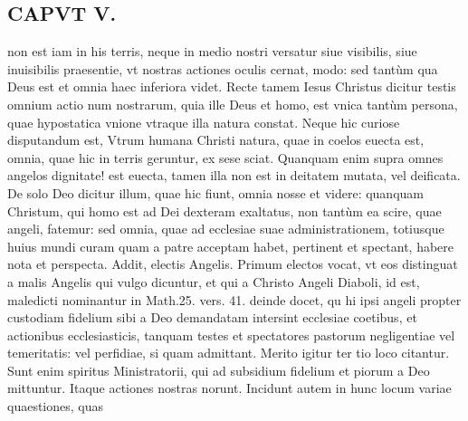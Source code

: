 \documentclass{article}
\begin{document}
\begin{pages}
\section*{CAPVT  V. }
\marginpar{[ p.3 ]}\pstart non est iam in his terris, neque in medio nostri versatur siue visibilis, siue inuisibilis praesentie, vt nostras actiones oculis cernat, modo: sed tantùm qua Deus est et omnia haec inferiora videt. Recte tamem Iesus Christus dicitur testis omnium actio num nostrarum, quia ille Deus et homo, est vnica tantùm persona, quae hypostatica vnione vtraque illa natura constat. Neque hic curiose disputandum est, Vtrum humana Christi natura, quae in coelos euecta est, omnia, quae hic in terris geruntur, ex sese sciat. Quanquam enim supra omnes angelos dignitate! est euecta, tamen illa non est in deitatem mutata, vel deificata. De solo Deo dicitur illum, quae hic fiunt, omnia nosse et videre: quanquam Christum, qui homo est ad Dei dexteram exaltatus, non tantùm ea scire, quae angeli, fatemur: sed omnia, quae ad ecclesiae suae administrationem, totiusque  huius mundi curam quam a patre acceptam habet, pertinent et spectant, habere nota et perspecta.  \pend\pstart Addit, electis Angelis. Primum electos vocat, vt eos distinguat a malis Angelis qui vulgo dicuntur, et qui a Christo Angeli Diaboli, id est, maledicti nominantur in Math.25. vers. 41. deinde docet, qu hi ipsi angeli propter custodiam fidelium sibi a Deo demandatam intersint ecclesiae coetibus, et actionibus ecclesiasticis, tanquam testes et spectatores pastorum negligentiae vel temeritatis: vel perfidiae, si quam admittant. Merito igitur ter tio loco citantur. Sunt enim spiritus Ministratorii, qui ad subsidium fidelium et piorum a Deo mittuntur. Itaque actiones nostras norunt. Incidunt autem in hunc locum variae quaestiones, quas  \pend

\end{pages}
\end{document}
